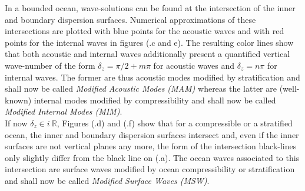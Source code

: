 \documentclass[a4paper,11pt]{article}
\begin{document}
In a bounded ocean, wave-solutions can be found at the intersection of the inner and boundary dispersion surfaces. Numerical approximations of these intersections are plotted with blue points for the acoustic waves and with red points for the internal waves in figures (.c and e). The resulting color lines show that both acoustic and internal waves additionally present a quantified vertical wave-number of the form $\delta_z=\pi/2+m\pi$ for acoustic waves and $\delta_z=n\pi$ for internal waves. The former are thus acoustic modes modified by stratification and shall now be called \textit{Modified Acoustic Modes (MAM)} whereas the latter are (well-known) internal modes modified by compressibility and shall now be called \textit{Modified Internal Modes (MIM)}.\\

If now $\delta_z\in i\ \mathbb{R}$, Figures (.d) and (.f) show that for a compressible or a stratified ocean, the inner and boundary dispersion surfaces intersect and, even if the inner surfaces are not vertical planes any more, the form of the intersection black-lines only slightly differ from the black line on (.a). The ocean waves associated to this intersection are surface waves modified by ocean compressibility or stratification and shall now be called \textit{Modified Surface Waves (MSW)}.\\ 
\end{document}
